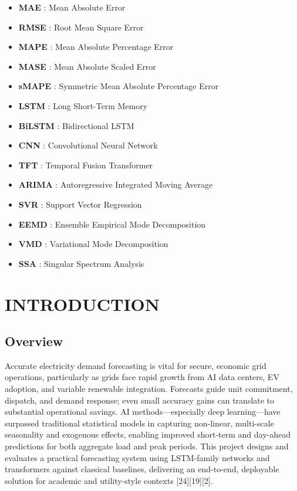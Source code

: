 \documentclass[12pt,a4paper]{report}
\begin{document}
\begin{itemize}
  \item[] \textbf{MAE} : Mean Absolute Error
  \item[] \textbf{RMSE} : Root Mean Square Error
  \item[] \textbf{MAPE} : Mean Absolute Percentage Error
  \item[] \textbf{MASE} : Mean Absolute Scaled Error
  \item[] \textbf{sMAPE} : Symmetric Mean Absolute Percentage Error
  \item[] \textbf{LSTM} : Long Short-Term Memory
  \item[] \textbf{BiLSTM} : Bidirectional LSTM
  \item[] \textbf{CNN} : Convolutional Neural Network
  \item[] \textbf{TFT} : Temporal Fusion Transformer
  \item[] \textbf{ARIMA} : Autoregressive Integrated Moving Average
  \item[] \textbf{SVR} : Support Vector Regression
  \item[] \textbf{EEMD} : Ensemble Empirical Mode Decomposition
  \item[] \textbf{VMD} : Variational Mode Decomposition
  \item[] \textbf{SSA} : Singular Spectrum Analysis
\end{itemize}

\vspace{2cm}
\begin{center}
  \end{center}


\newpage

\chapter{INTRODUCTION}
\section{Overview}
Accurate electricity demand forecasting is vital for secure, economic grid operations, particularly as grids face rapid growth from AI data centers, EV adoption, and variable renewable integration. Forecasts guide unit commitment, dispatch, and demand response; even small accuracy gains can translate to substantial operational savings. AI methods—especially deep learning—have surpassed traditional statistical models in capturing non-linear, multi-scale seasonality and exogenous effects, enabling improved short-term and day-ahead predictions for both aggregate load and peak periods. This project designs and evaluates a practical forecasting system using LSTM-family networks and transformers against classical baselines, delivering an end-to-end, deployable solution for academic and utility-style contexts [24][19][2].
\end{document}
